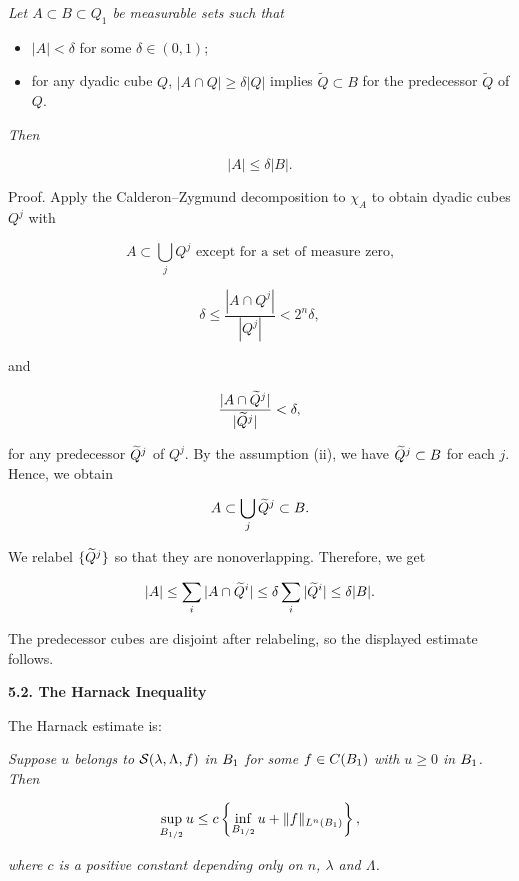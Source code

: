 \medskip

\begin{lemma}\label{hanlin:ch05-lem-5-9} \textit{Let $A\subset B\subset Q_1$ be measurable sets such that}
\begin{itemize}
\item[(i)] $|A|<\delta$ for some $\delta\in(0,1)$;
\item[(ii)] for any dyadic cube $Q$, $|A\cap Q|\geq \delta|Q|$ implies $\tilde Q\subset B$ for the predecessor $\tilde Q$ of $Q$.
\end{itemize}
\textit{Then}

\[
|A|\leq \delta|B|.
\]
\end{lemma}


Proof. \sketch Apply the Calderon--Zygmund decomposition to $\chi_A$ to obtain dyadic cubes $Q^j$ with

\[
A \subset \bigcup_j Q^j \text{ except for a set of measure zero,}
\]

\[
\delta \leq \frac{|A\cap Q^j|}{|Q^j|} < 2^n\delta,
\]

and

\[
\frac{|A\cap \widetilde{Q}^j|}{|\widetilde{Q}^j|} < \delta,
\]

for any predecessor $\widetilde{Q}^j$ of $Q^j$. By the assumption (ii), we have $\widetilde{Q}^j \subset B$ for each $j$.
Hence, we obtain

\[
A \subset \bigcup_j \widetilde{Q}^j \subset B.
\]

We relabel $\{\widetilde{Q}^j\}$ so that they are nonoverlapping. Therefore, we get

\[
|A| \leq \sum_i |A\cap \widetilde{Q}^i| \leq \delta \sum_i |\widetilde{Q}^i| \leq \delta |B|.
\]

The predecessor cubes are disjoint after relabeling, so the displayed estimate follows.

\medskip


\noindent\textbf{5.2. The Harnack Inequality}

The Harnack estimate is:

\medskip

\begin{theorem}\label{hanlin:ch05-thm-5-10} \textit{Suppose $u$ belongs to $\mathcal{S}(\lambda,\Lambda,f)$ in $B_1$ for some $f\in C(B_1)$ with $u\geq 0$ in $B_1$. Then}

\[
\sup_{B_{1/2}} u \leq c\left\{\inf_{B_{1/2}} u + \|f\|_{L^n(B_1)}\right\},
\]

\textit{where $c$ is a positive constant depending only on $n$, $\lambda$ and $\Lambda$.}
\end{theorem}

